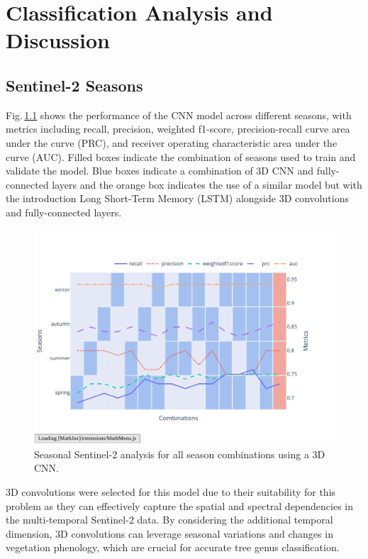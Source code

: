 \chapter{Classification Analysis and Discussion}
\label{chapter:analysis}

\section{Sentinel-2 Seasons}
\label{section:seasonal}

Fig.\,\ref{fig:seasonal_selection} shows the performance of the CNN model across different seasons, with metrics including recall, precision, weighted f1-score, precision-recall curve area under the curve (PRC), and receiver operating characteristic area under the curve (AUC). Filled boxes indicate the combination of seasons used to train and validate the model. Blue boxes indicate a combination of 3D CNN and fully-connected layers and the orange box indicates the use of a similar model but with the introduction Long Short-Term Memory (LSTM) alongside 3D convolutions and fully-connected layers.

\begin{figure}[ht]
    \centering
    \includegraphics[width=0.9\linewidth, trim={20pt 40pt 10pt 30pt}, clip]{figures/figures_analysis/seasonal_selection.pdf}
    \caption{Seasonal Sentinel-2 analysis for all season combinations using a 3D CNN.}
    \label{fig:seasonal_selection}
\end{figure}

3D convolutions were selected for this model due to their suitability for this problem as they can effectively capture the spatial and spectral dependencies in the multi-temporal Sentinel-2 data. By considering the additional temporal dimension, 3D convolutions can leverage seasonal variations and changes in vegetation phenology, which are crucial for accurate tree genus classification.

